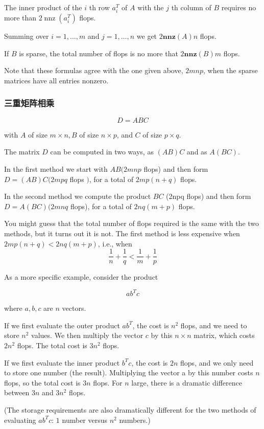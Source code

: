 The inner product of the $ i $ th row $ a_{i}^{T} $ of $ A $ with the $ j $ th column of $ B $ requires no more than $ 2 \operatorname{nnz}\left(a_{i}^{T}\right) $ flops. 

Summing over $ i=1, \ldots, m $ and $ j=1, \ldots, n $ we get $ 2 \mathbf{n n z}(A) n $ flops. 

If $ B $ is sparse, the total number of flops is no more that $ 2 \mathbf{n n z}(B) m $ flops. 

\begin{remark}
    Note that these formulas agree with the one given above, $ 2 m n p $, when the sparse matrices have all entries nonzero.
\end{remark}

\subsubsection{三重矩阵相乘}

$$ D=A B C $$

with $ A $ of size $ m \times n, B $ of size $ n \times p $, and $ C $ of size $ p \times q $. 

The matrix $ D $ can be computed in two ways, as $ (A B) C $ and as $ A(B C) $. 

In the first method we start with $ A B(2 m n p $ flops) and then form $ D=(A B) C(2 m p q $ flops $ ) $, for a total of $ 2 m p(n+q) $ flops. 

In the second method we compute the product $ B C $ (2npq flops) and then form $ D=A(B C)(2 m n q $ flops), for a total of $ 2 n q(m+p) $ flops.

\begin{remark}
    You might guess that the total number of flops required is the same with the two methods, but it turns out it is not. The first method is less expensive when $ 2 m p(n+q)<2 n q(m+p) $, i.e., when
$$
\frac{1}{n}+\frac{1}{q}<\frac{1}{m}+\frac{1}{p}
$$
\end{remark}

\begin{example}
    As a more specific example, consider the product 
    
    $$ a b^{T} c $$
    
    where $ a, b, c $ are $ n $ vectors. 
    
    If we first evaluate the outer product $ a b^{T} $, the cost is $ n^{2} $ flops, and we need to store $ n^{2} $ values. We then multiply the vector $ c $ by this $ n \times n $ matrix, which costs $ 2 n^{2} $ flops. The total cost is $ 3 n^{2} $ flops.

    If we first evaluate the inner product $b^Tc$, the cost is $2n$ flops, and we only need to store one number (the result). Multiplying the vector a by this number costs $n$ flops, so the total cost is $3n$ flops. For $n$ large, there is a dramatic difference between $3n$ and $3n^2$ flops.

    (The storage requirements are also dramatically different for the two methods of evaluating $ab^Tc$: $1$ number versus $n^2$ numbers.)
\end{example}

